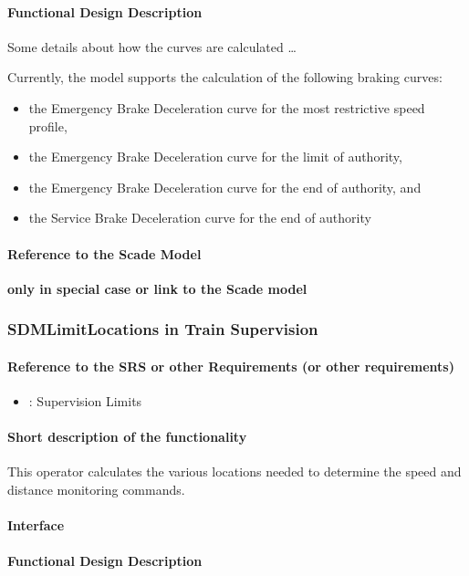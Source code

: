 \paragraph{Functional Design Description}
Some details about how the curves are calculated \dots

Currently, the model supports the calculation of the following braking curves:
\begin{itemize}
	\item the Emergency Brake Deceleration curve for the most restrictive speed profile,
	\item the Emergency Brake Deceleration curve for the limit of authority,
	\item the Emergency Brake Deceleration curve for the end of authority, and
	\item the Service Brake Deceleration curve for the end of authority
\end{itemize}
\paragraph{Reference to the Scade Model}
\textbf{only in special case or link to the Scade model}

\subsubsection{SDMLimitLocations in Train Supervision} 
\paragraph{Reference to the SRS or other Requirements (or other requirements)}
\begin{itemize}
	\item \cite[Chapt.~3.13.9]{subset-026}: Supervision Limits 
\end{itemize}

\paragraph{Short description of the functionality}
This operator calculates the various locations needed to determine the speed and distance monitoring commands.

\paragraph{Interface}
\paragraph{Functional Design Description}
